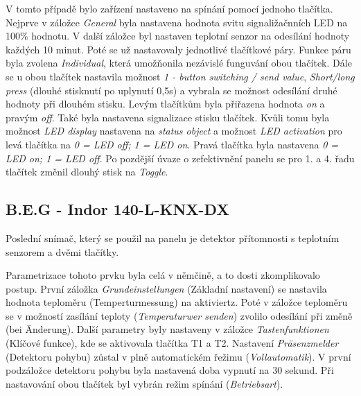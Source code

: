 V tomto případě bylo zařízení nastaveno na spínání pomocí jednoho tlačítka. Nejprve v záložce \textit{General} byla nastavena hodnota svitu signaližačnních LED na 100\% hodnotu. V další záložce byl nastaven teplotní senzor na odesílání hodnoty každých 10 minut. Poté se už nastavovaly jednotlivé tlačítkové páry. Funkce páru byla zvolena \textit{Individual}, která umožňonila nezávislé funguvání obou tlačítek. Dále se u obou tlačítek nastavila možnost \textit{1 - button switching / send value}, \textit{Short/long press} (dlouhé stisknutí po uplynutí 0,5s) a vybrala se možnost odesílání druhé hodnoty při dlouhém stisku. Levým tlačítkům byla přiřazena hodnota \textit{on} a pravým \textit{off}. Také byla nastavena signalizace stisku tlačítek. Kvůli tomu byla možnost \textit{LED display} nastavena na \textit{status object} a možnost \textit{LED activation} pro levá tlačítka na \textit{0 = LED off; 1 = LED on}. Pravá tlačítka byla nastavena \textit{0 = LED on; 1 = LED off}. Po pozdější úvaze o zefektivnění panelu se pro 1. a 4. řadu tlačítek změnil dlouhý stisk na \textit{Toggle}.  

\subsection{B.E.G - Indor 140-L-KNX-DX}
Poslední snímač, který se použil na panelu je detektor přítomnosti s teplotním senzorem a dvěmi tlačítky. \cite{BEG}

Parametrizace tohoto prvku byla celá v němčině, a to dosti zkomplikovalo postup. První záložka \textit{Grundeinstellungen} (Základní nastavení) se nastavila hodnota teploměru (Temperturmessung) na aktiviertz. Poté v záložce teploměru se v možností zasílání teploty (\textit{Temperaturwer senden}) zvolilo odesílání při změně (bei Änderung). Další parametry byly nastaveny v záložce \textit{Tastenfunktionen} (Klíčové funkce), kde se aktivovala tlačítka T1 a T2. Nastavení \textit{Präsenzmelder} (Detektoru pohybu) zůstal v plně automatickém řežimu (\textit{Vollautomatik}). V první podzáložce detektoru pohybu byla nastavená doba vypnutí na 30 sekund. Při nastavování obou tlačítek byl vybrán režim spínání (\textit{Betriebsart}).

